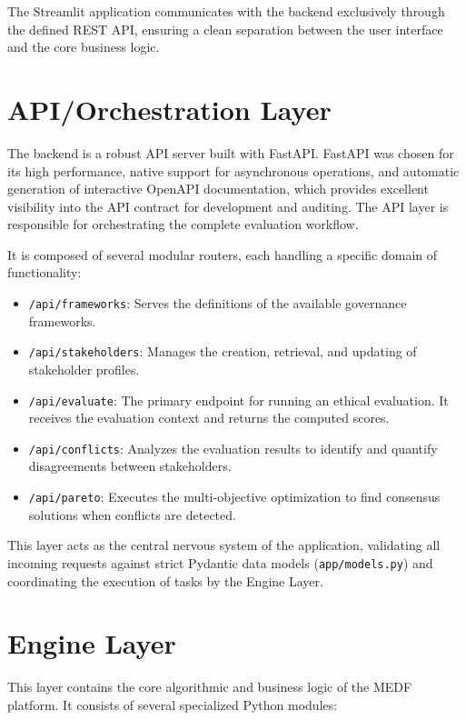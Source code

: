 The Streamlit application communicates with the backend exclusively through the defined REST API, ensuring a clean separation between the user interface and the core business logic.

\section{API/Orchestration Layer}
\label{sec:api}

The backend is a robust API server built with FastAPI. FastAPI was chosen for its high performance, native support for asynchronous operations, and automatic generation of interactive OpenAPI documentation, which provides excellent visibility into the API contract for development and auditing. The API layer is responsible for orchestrating the complete evaluation workflow.

It is composed of several modular routers, each handling a specific domain of functionality:

\begin{itemize}[leftmargin=2em]
  \item \texttt{/api/frameworks}: Serves the definitions of the available governance frameworks.
  \item \texttt{/api/stakeholders}: Manages the creation, retrieval, and updating of stakeholder profiles.
  \item \texttt{/api/evaluate}: The primary endpoint for running an ethical evaluation. It receives the evaluation context and returns the computed scores.
  \item \texttt{/api/conflicts}: Analyzes the evaluation results to identify and quantify disagreements between stakeholders.
  \item \texttt{/api/pareto}: Executes the multi-objective optimization to find consensus solutions when conflicts are detected.
\end{itemize}

This layer acts as the central nervous system of the application, validating all incoming requests against strict Pydantic data models (\texttt{app/models.py}) and coordinating the execution of tasks by the Engine Layer.

\section{Engine Layer}
\label{sec:engine}

This layer contains the core algorithmic and business logic of the MEDF platform. It consists of several specialized Python modules:

